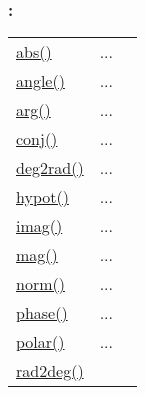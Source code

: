 \subsubsection*{: }

\textcolor{blue}{}\begin{tabular}{>{\raggedleft}p{3cm}>{\centering}p{0.5cm}l}
\textcolor{blue}{\hyperlink{abs}{abs()}}&
...&
 \begin{NoHyper} \nameref{par:Absolute-value} \end{NoHyper}\tabularnewline
\textcolor{blue}{\hyperlink{angle}{angle()}}&
...&
 \begin{NoHyper} \nameref{par:angle} \end{NoHyper}\tabularnewline
\textcolor{blue}{\hyperlink{arg}{arg()}}&
...&
 \begin{NoHyper} \nameref{par:arg} \end{NoHyper}\tabularnewline
\textcolor{blue}{\hyperlink{conj}{conj()}}&
...&
 \begin{NoHyper} \nameref{par:Conjugate} \end{NoHyper}\tabularnewline
\textcolor{blue}{\hyperlink{deg2rad}{deg2rad()}}&
...&
 \begin{NoHyper} \nameref{par:deg2rad} \end{NoHyper}\tabularnewline
\textcolor{blue}{\hyperlink{hypot}{hypot()}}&
...&
 \begin{NoHyper} \nameref{par:hypot} \end{NoHyper}\tabularnewline
\textcolor{blue}{\hyperlink{imag}{imag()}}&
...&
 \begin{NoHyper} \nameref{par:Imag} \end{NoHyper}\tabularnewline
\textcolor{blue}{\hyperlink{mag}{mag()}}&
...&
 \begin{NoHyper} \nameref{par:Magnitude} \end{NoHyper}\tabularnewline
\textcolor{blue}{\hyperlink{norm}{norm()}}&
...&
 \begin{NoHyper} \nameref{par:norm} \end{NoHyper}\tabularnewline
\textcolor{blue}{\hyperlink{phase}{phase()}}&
...&
 \begin{NoHyper} \nameref{par:Phase} \end{NoHyper}\tabularnewline
\textcolor{blue}{\hyperlink{polar}{polar()}}&
...&
 \begin{NoHyper} \nameref{par:polar} \end{NoHyper}\tabularnewline
\textcolor{blue}{\hyperlink{rad2deg}{rad2deg()}}&

\end{tabular}
